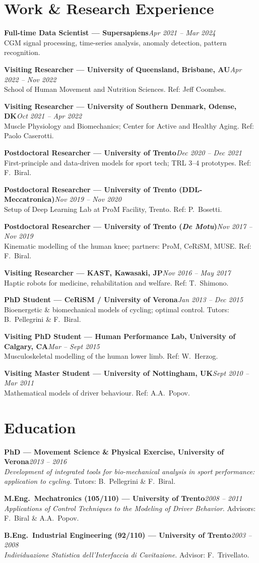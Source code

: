 \documentclass[10pt,a4paper]{article}
\newcommand{\entry}[3]{%
  \textbf{#2}\hfill\textit{\small#1}\\[1pt]
  \small#3\par\vspace{5pt}%
}
\begin{document}
\section{Work \& Research Experience}

\entry{Apr 2021 – Mar 2024}{Full-time Data Scientist — Supersapiens}{CGM signal processing, time-series analysis, anomaly detection, pattern recognition.}
\entry{Apr 2022 – Nov 2022}{Visiting Researcher — University of Queensland, Brisbane, AU}{School of Human Movement and Nutrition Sciences. Ref: Jeff Coombes.}
\entry{Oct 2021 – Apr 2022}{Visiting Researcher — University of Southern Denmark, Odense, DK}{Muscle Physiology and Biomechanics; Center for Active and Healthy Aging. Ref: Paolo Caserotti.}
\entry{Dec 2020 – Dec 2021}{Postdoctoral Researcher — University of Trento}{First-principle and data-driven models for sport tech; TRL 3–4 prototypes. Ref: F.\ Biral.}
\entry{Nov 2019 – Nov 2020}{Postdoctoral Researcher — University of Trento (DDL-Meccatronica)}{Setup of Deep Learning Lab at ProM Facility, Trento. Ref: P.\ Bosetti.}
\entry{Nov 2017 – Nov 2019}{Postdoctoral Researcher — University of Trento (\textit{De Motu})}{Kinematic modelling of the human knee; partners: ProM, CeRiSM, MUSE. Ref: F.\ Biral.}
\entry{Nov 2016 – May 2017}{Visiting Researcher — KAST, Kawasaki, JP}{Haptic robots for medicine, rehabilitation and welfare. Ref: T.\ Shimono.}
\entry{Jan 2013 – Dec 2015}{PhD Student — CeRiSM / University of Verona}{Bioenergetic \& biomechanical models of cycling; optimal control. Tutors: B.\ Pellegrini \& F.\ Biral.}
\entry{Mar – Sept 2015}{Visiting PhD Student — Human Performance Lab, University of Calgary, CA}{Musculoskeletal modelling of the human lower limb. Ref: W.\ Herzog.}
\entry{Sept 2010 – Mar 2011}{Visiting Master Student — University of Nottingham, UK}{Mathematical models of driver behaviour. Ref: A.A.\ Popov.}

\section{Education}

\entry{2013 – 2016}{PhD — Movement Science \& Physical Exercise, University of Verona}{\textit{Development of integrated tools for bio-mechanical analysis in sport performance: application to cycling.} Tutors: B.\ Pellegrini \& F.\ Biral.}
\entry{2008 – 2011}{M.Eng.\ Mechatronics (105/110) — University of Trento}{\textit{Applications of Control Techniques to the Modeling of Driver Behavior.} Advisors: F.\ Biral \& A.A.\ Popov.}
\entry{2003 – 2008}{B.Eng.\ Industrial Engineering (92/110) — University of Trento}{\textit{Individuazione Statistica dell'Interfaccia di Cavitazione.} Advisor: F.\ Trivellato.}
\end{document}
